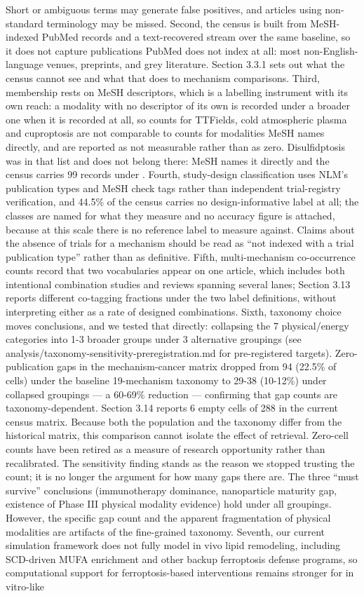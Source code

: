 \documentclass[11pt,twoside,openright]{report}
\begin{document}
Short or ambiguous terms may generate false positives, and articles using non-standard terminology may be missed. Second, the census is built from MeSH-indexed PubMed records and a text-recovered stream over the same baseline, so it does not capture publications PubMed does not index at all: most non-English-language venues, preprints, and grey literature. Section 3.3.1 sets out what the census cannot see and what that does to mechanism comparisons. Third, membership rests on MeSH descriptors, which is a labelling instrument with its own reach: a modality with no descriptor of its own is recorded under a broader one when it is recorded at all, so counts for TTFields, cold atmospheric plasma and cuproptosis are not comparable to counts for modalities MeSH names directly, and are reported as not measurable rather than as zero. Disulfidptosis was in that list and does not belong there: MeSH names it directly and the census carries 99 records under . Fourth, study-design classification uses NLM's publication types and MeSH check tags rather than independent trial-registry verification, and 44.5\% of the census carries no design-informative label at all; the classes are named for what they measure and no accuracy figure is attached, because at this scale there is no reference label to measure against. Claims about the absence of trials for a mechanism should be read as ``not indexed with a trial publication type'' rather than as definitive. Fifth, multi-mechanism co-occurrence counts record that two vocabularies appear on one article, which includes both intentional combination studies and reviews spanning several lanes; Section 3.13 reports different co-tagging fractions under the two label definitions, without interpreting either as a rate of designed combinations. Sixth, taxonomy choice moves conclusions, and we tested that directly: collapsing the 7 physical/energy categories into 1-3 broader groups under 3 alternative groupings (see analysis/taxonomy-sensitivity-preregistration.md for pre-registered targets). Zero-publication gaps in the mechanism-cancer matrix dropped from 94 (22.5\% of cells) under the baseline 19-mechanism taxonomy to 29-38 (10-12\%) under collapsed groupings --- a 60-69\% reduction --- confirming that gap counts are taxonomy-dependent. Section 3.14 reports 6 empty cells of 288 in the current census matrix. Because both the population and the taxonomy differ from the historical matrix, this comparison cannot isolate the effect of retrieval. Zero-cell counts have been retired as a measure of research opportunity rather than recalibrated. The sensitivity finding stands as the reason we stopped trusting the count; it is no longer the argument for how many gaps there are. The three ``must survive'' conclusions (immunotherapy dominance, nanoparticle maturity gap, existence of Phase III physical modality evidence) hold under all groupings. However, the specific gap count and the apparent fragmentation of physical modalities are artifacts of the fine-grained taxonomy. Seventh, our current simulation framework does not fully model in vivo lipid remodeling, including SCD-driven MUFA enrichment and other backup ferroptosis defense programs, so computational support for ferroptosis-based interventions remains stronger for in vitro-like 
\end{document}
